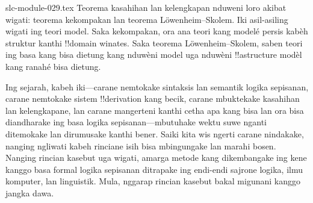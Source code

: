 \begin{filecontents*}[overwrite]{slc-module-029.tex}
Teorema kasahihan lan kelengkapan nduweni loro akibat wigati: teorema
kekompakan lan teorema L\"owenheim--Skolem. Iki asil-asiling wigati ing
teori model. Saka kekompakan, ora ana teori kang modelé persis
kabèh struktur kanthi !!{domain} winates. Saka teorema
L\"owenheim--Skolem, saben teori ing basa kang bisa dietung kang
nduwèni model uga nduwèni !!a{structure} modèl kang ranahé bisa
dietung.

Ing sejarah, kabeh iki---carane nemtokake sintaksis lan semantik logika
sepisanan, carane nemtokake sistem !!{derivation} kang becik, carane
mbuktekake kasahihan lan kelengkapane, lan carane mangerteni kanthi
cetha apa kang bisa lan ora bisa diandharake ing basa logika
sepisanan---mbutuhake wektu suwe nganti ditemokake lan dirumusake kanthi
bener. Saiki kita wis ngerti carane nindakake, nanging ngliwati kabeh
rinciane isih bisa mbingungake lan marahi bosen. Nanging rincian kasebut
uga wigati, amarga metode kang dikembangake ing kene kanggo basa formal
logika sepisanan ditrapake ing endi-endi sajrone logika, ilmu komputer,
lan linguistik. Mula, nggarap rincian kasebut bakal migunani kanggo
jangka dawa.


\end{filecontents*}

